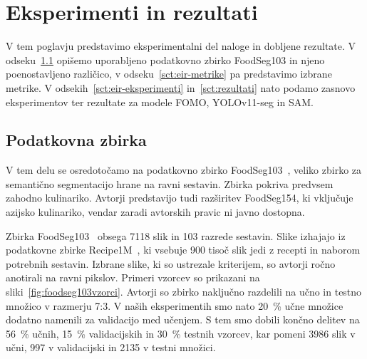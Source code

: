 \documentclass[a4paper,twoside,openright,12pt,slovene]{book}
\begin{document}
\chapter{Eksperimenti in rezultati} \label{sct:eir}

    V tem poglavju predstavimo eksperimentalni del naloge in dobljene
    rezultate. V odseku~\ref{sct:eir-podatkovnazbirka}
    opišemo uporabljeno podatkovno zbirko
    FoodSeg103 in njeno poenostavljeno različico, v
    odseku~\ref{sct:eir-metrike} pa predstavimo
    izbrane metrike. V odsekih~\ref{sct:eir-eksperimenti}
    in~\ref{sct:rezultati}
    nato podamo zasnovo eksperimentov ter rezultate
    za modele FOMO, YOLOv11-seg in SAM.

    \section{Podatkovna zbirka} \label{sct:eir-podatkovnazbirka}

        V tem delu se osredotočamo na podatkovno zbirko
        FoodSeg103~\cite{src:wu2021large}, veliko zbirko za semantično
        segmentacijo hrane na ravni sestavin. Zbirka pokriva predvsem zahodno
        kulinariko. Avtorji predstavijo tudi razširitev FoodSeg154, ki
        vključuje azijsko kulinariko, vendar zaradi avtorskih pravic ni javno
        dostopna.

        Zbirka FoodSeg103~\cite{src:wu2021large} obsega 7118 slik in 103
        razrede sestavin. Slike izhajajo iz podatkovne zbirke
        Recipe1M~\cite{src:marin2021recipe1m+,src:salvador2017learning}, ki
        vsebuje 900 tisoč slik jedi z recepti in naborom potrebnih sestavin.
        Izbrane slike, ki so ustrezale kriterijem, so avtorji ročno anotirali
        na ravni pikslov. Primeri vzorcev so prikazani na
        sliki~\ref{fig:foodseg103vzorci}.
        Avtorji so zbirko naključno razdelili na učno in testno množico v
        razmerju 7:3. V naših eksperimentih smo nato 20~\% učne množice dodatno
        namenili za validacijo med učenjem. S tem smo dobili končno delitev na
        56~\% učnih, 15~\% validacijskih in 30~\% testnih vzorcev, kar pomeni
        3986 slik v učni, 997 v validacijski in 2135 v testni množici.
\end{document}
